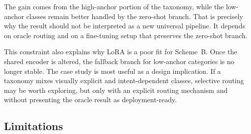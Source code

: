 \documentclass{ieeeaccess}
\begin{document}
\begin{table}[!t]
\caption{Comparison of annotation strategies on TeacherBehavior
(validation accuracy, \%). The selective strategy uses pseudo-labels
for high-anchor classes and zero-shot CLIP for low-anchor classes.
High-anchor: blackboard-writing, teacher, screen, blackboard.
Low-anchor: guide, answer, on-stage interaction, stand.
The zero-shot baseline in this table uses the prompt-ensemble setting.
\textbf{Selective routing uses ground-truth category as oracle routing
variable at evaluation time and represents a diagnostic upper bound,
not a deployable pipeline or a deployable-method comparison.}}
\label{tab:selective_results}
\centering
{}
\end{table}

The gain comes from the high-anchor portion of the taxonomy, while the
low-anchor classes remain better handled by the zero-shot branch.
That is precisely why the result should not be interpreted as a new
universal pipeline.
It depends on oracle routing and on a fine-tuning setup that preserves
the zero-shot branch.

This constraint also explains why LoRA is a poor fit for Scheme~B.
Once the shared encoder is altered, the fallback branch for low-anchor
categories is no longer stable.
The case study is most useful as a design implication.
If a taxonomy mixes visually explicit and intent-dependent classes,
selective routing may be worth exploring, but only with an explicit
routing mechanism and without presenting the oracle result as
deployment-ready.

\subsection{Limitations}
\label{sec:limitations}
\end{document}
